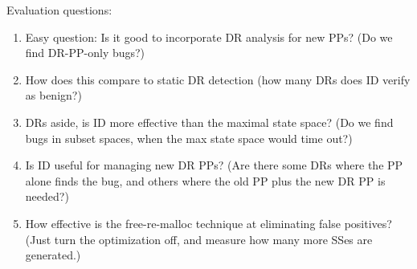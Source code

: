 \documentclass[pldi]{sigplanconf-pldi15}
\begin{document}
Evaluation questions:
\begin{enumerate}
	\item Easy question: Is it good to incorporate DR analysis for new PPs? (Do we find DR-PP-only bugs?)
	\item How does this compare to static DR detection (how many DRs does ID verify as benign?)
	\item DRs aside, is ID more effective than the maximal state space? (Do we find bugs in subset spaces, when the max state space would time out?)
	\item Is ID useful for managing new DR PPs? (Are there some DRs where the PP alone finds the bug, and others where the old PP plus the new DR PP is needed?)
	\item How effective is the free-re-malloc technique at eliminating false positives? (Just turn the optimization off, and measure how many more SSes are generated.)




\end{enumerate}
\end{document}
